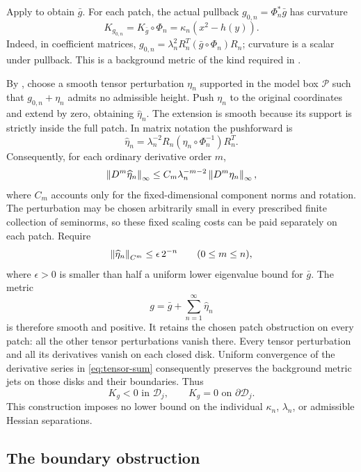 Apply  to obtain \(\bar g\).
For each patch, the actual pullback \(g_{0,n}=\Phi_n^*\bar g\)
has curvature
\[
K_{g_{0,n}}=K_{\bar g}\circ\Phi_n
=\kappa_n(x^2-h(y)).
\]
Indeed, in coefficient matrices,
\(g_{0,n}=\lambda_n^2R_n^T(\bar g\circ\Phi_n)R_n\);
curvature is a scalar under pullback.
This is a background metric of the kind required in
.

By , choose a smooth tensor perturbation
\(\eta_n\) supported in the model box \(\mathcal P\) such that
\(g_{0,n}+\eta_n\) admits no admissible height.
Push \(\eta_n\) to the original coordinates and extend by zero,
obtaining \(\widehat\eta_n\).
The extension is smooth because its support is strictly inside
the full patch. In matrix notation the pushforward is
\[
\widehat\eta_n
=\lambda_n^{-2}R_n(\eta_n\circ\Phi_n^{-1})R_n^T.
\]
Consequently, for each ordinary derivative order \(m\),
\[
\left\lVert D^m\widehat\eta_n\right\rVert_\infty
\le C_m\lambda_n^{-m-2}\left\lVert D^m\eta_n\right\rVert_\infty,
\]
where \(C_m\) accounts only for the fixed-dimensional component
norms and rotation. The perturbation may be chosen arbitrarily
small in every prescribed finite collection of seminorms, so
these fixed scaling costs can be paid separately on each patch.
Require
\begin{equation}\label{eq:tensor-sum}
\left\lVert\widehat\eta_n\right\rVert_{C^m}\le\epsilon\,2^{-n}
\qquad(0\le m\le n),
\end{equation}
where \(\epsilon>0\) is smaller than half a uniform lower
eigenvalue bound for \(\bar g\).
The metric
\begin{equation}\label{eq:final-metric}
g=\bar g+\sum_{n=1}^\infty\widehat\eta_n
\end{equation}
is therefore smooth and positive.
It retains the chosen patch obstruction on every patch:
all the other tensor perturbations vanish there.
Every tensor perturbation and all its derivatives vanish on
each closed disk. Uniform convergence of the derivative series
in \eqref{eq:tensor-sum} consequently preserves the background
metric jets on those disks and their boundaries. Thus
\begin{equation}\label{eq:disk-curvature}
K_g<0\text{ in }\mathcal D_j,\qquad
K_g=0\text{ on }\partial\mathcal D_j.
\end{equation}
This construction imposes no lower bound on the individual
\(\kappa_n\), \(\lambda_n\), or admissible Hessian separations.

\subsection{The boundary obstruction}

